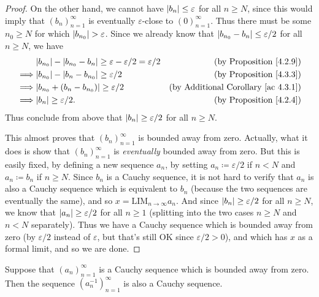 \begin{proof}
    On the other hand, we cannot have \(\abs*{b_n} \leq \varepsilon\) for all \(n \geq N\), since this would imply that \((b_n)_{n = 1}^{\infty}\) is eventually \(\varepsilon\)-close to \((0)_{n = 1}^{\infty}\).
    Thus there must be some \(n_0 \geq N\) for which \(\abs*{b_{n_0}} > \varepsilon\).
    Since we already know that \(\abs*{b_{n_0} - b_n} \leq \varepsilon / 2\) for all \(n \geq N\), we have
    \begin{align*}
                 & \abs*{b_{n_0}} - \abs*{b_{n_0} - b_n} \geq \varepsilon - \varepsilon / 2 = \varepsilon / 2 & \text{(by Proposition \ref{4.2.9})}             \\
        \implies & \abs*{b_{n_0}} - \abs*{b_n - b_{n_0}} \geq \varepsilon / 2                                 & \text{(by Proposition \ref{4.3.3})}             \\
        \implies & \abs*{b_{n_0} + (b_n - b_{n_0})} \geq \varepsilon / 2                                      & \text{(by Additional Corollary \ref{ac 4.3.1})} \\
        \implies & \abs*{b_n} \geq \varepsilon / 2.                                                           & \text{(by Proposition \ref{4.2.4})}             \\
    \end{align*}
    Thus conclude from above that \(\abs*{b_n} \geq \varepsilon / 2\) for all \(n \geq N\).

    This almost proves that \((b_n)_{n = 1}^{\infty}\) is bounded away from zero.
    Actually, what it does is show that \((b_n)_{n = 1}^{\infty}\) is \emph{eventually} bounded away from zero.
    But this is easily fixed, by defining a new sequence \(a_n\), by setting \(a_n \coloneqq \varepsilon / 2\) if \(n < N\) and \(a_n \coloneqq b_n\) if \(n \geq N\).
    Since \(b_n\) is a Cauchy sequence, it is not hard to verify that \(a_n\) is also a Cauchy sequence which is equivalent to \(b_n\) (because the two sequences are eventually the same), and so \(x = \text{LIM}_{n \to \infty} a_n\).
    And since \(\abs*{b_n} \geq \varepsilon / 2\) for all \(n \geq N\), we know that \(\abs*{a_n} \geq \varepsilon / 2\) for all \(n \geq 1\) (splitting into the two cases \(n \geq N\) and \(n < N\) separately).
    Thus we have a Cauchy sequence which is bounded away from zero (by \(\varepsilon / 2\) instead of \(\varepsilon\), but that’s still OK since \(\varepsilon / 2 > 0\)), and which has \(x\) as a formal limit, and so we are done.
\end{proof}

\begin{lemma}\label{5.3.15}
    Suppose that \((a_n)_{n = 1}^{\infty}\) is a Cauchy sequence which is bounded away from zero.
    Then the sequence \((a_n^{-1})_{n = 1}^{\infty}\) is also a Cauchy sequence.
\end{lemma}

